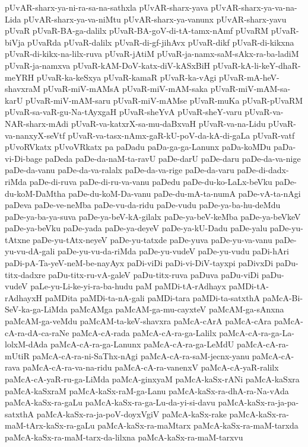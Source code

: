 {pUvAR-sharx-ya-ni-ra-sa-na-sathxla
pUvAR-sharx-yava
pUvAR-sharx-ya-va-na-Lida
pUvAR-sharx-ya-va-niMtu
pUvAR-sharx-ya-vanunx
pUvAR-sharx-yavu
pUvaR
pUvaR-BA-ga-dalilx
pUvaR-BA-goV-di-tA-tamx-nAmf
pUvaRM
pUvaR-biVja
pUvaRda
pUvaR-dalilx
pUvaR-di-gf-jihAvx
pUvaR-dikf
pUvaR-di-kikxna
pUvaR-di-kikx-na-lilx-ruva
pUvaR-jAtiM
pUvaR-ja-namx-saM-sAkx-ra-ba-ladiM
pUvaR-ja-namxva
pUvaR-kAM-DoV-katx-diV-kASxBiH
pUvaR-kA-li-keY-dhaR-meYRH
pUvaR-ka-keSxya
pUvaR-kamaR
pUvaR-ka-vAgi
pUvaR-mA-heV-shavxraM
pUvaR-miV-mAMsA
pUvaR-miV-mAM-saka
pUvaR-miV-mAM-sa-karU
pUvaR-miV-mAM-saru
pUvaR-miV-mAMse
pUvaR-muKa
pUvaR-pUvaRM
pUvaR-sa-vaR-gu-Na-tAyxgaH
pUvaR-sheYvA
pUvaR-sheY-varu
pUvaR-va-NAR-sharx-mAdi
pUvaR-va-katxrX-sa-mu-daBxvaH
pUvaR-va-na-Lidu
pUvaR-va-nanxyX-seVtf
pUvaR-va-tasx-nAmx-gaR-kU-poV-da-kA-di-gaLa
pUvaR-vatf
pUvoRVkatx
pUvoVRkatx
pa
paDadu
paDa-ga-ga-Lanunx
paDa-koMDu
paDa-vi-Di-bage
paDeda
paDe-da-naM-ta-ravU
paDe-darU
paDe-daru
paDe-da-va-nige
paDe-da-vanu
paDe-da-va-ralalx
paDe-da-va-rige
paDe-da-varu
paDe-di-dadx-riMda
paDe-di-ruva
paDe-di-ru-va-vanu
paDedu
paDe-du-ko-LaLx-beVku
paDe-du-koM-DaMtha
paDe-du-koM-Da-vanu
paDe-du-mA-ta-numA
paDe-vA-ta-nAgi
paDeva
paDe-ve-neMba
paDe-vu-da-ridu
paDe-vudu
paDe-ya-ba-hu-deMdu
paDe-ya-ba-ya-suva
paDe-ya-beV-kA-gilalx
paDe-ya-beV-keMba
paDe-ya-beVkeV
paDe-ya-beVku
paDe-yada
paDe-ya-deyeV
paDe-ya-kU-Dadu
paDe-yalu
paDe-yu-tAtxne
paDe-yu-tAtx-neyeV
paDe-yu-tatxde
paDe-yuva
paDe-yu-va-vanu
paDe-yu-vu-dA-gali
paDe-yu-vu-da-riMda
paDe-yu-vudeV
paDe-yu-vudu
paDi-hAri
paDi-pA-Ta-yeV-neM-be-nayAyx
paDi-viDi
paDi-vi-DiV-tayxpi
paDivxDi
paDu-titx-dadxre
paDu-titx-ru-vA-galeV
paDu-titx-ruva
paDuva
paDu-viDi
paDu-vudeV
paLe-yu-Li-ke-yi-ra-ba-hudu
paM
paMDi-tA-rAdhayx
paMDi-tA-rAdhayxH
paMDita
paMDi-ta-nA-gali
paMDi-tara
paMDi-ta-satxthA
paMcA-Bi-SeV-ka-ga-LiMda
paMcAMga
paMcAM-ga-mu-cayxteV
paMcAM-ga-sAnxna
paMcAM-ga-veMdu
paMcAM-ta-keV-shavxra
paMcA-cArA
paMcA-cAra
paMcA-cA-ra-dA-ca-raNe
paMcA-cA-rada
paMcA-cA-ra-ga-Lalilx
paMcA-cA-ra-ga-La-lolxM-dAda
paMcA-cA-ra-ga-Lanunx
paMcA-cA-ra-ga-LeMdU
paMcA-cA-ra-mUtiR
paMcA-cA-ra-ni-SaThx-nAgi
paMcA-cA-ra-saM-jecnx-yanu
paMcA-cA-rava
paMcA-cA-ra-va-na-ridu
paMcA-cA-ra-vanenxV
paMcA-cA-yaR-ralilx
paMcA-cA-yaR-ru-ga-LiMda
paMcA-ginxyaM
paMcA-kaSx-rANi
paMcA-kaSxra
paMcA-kaSxraM
paMcA-kaSx-raM-ga-Lanu
paMcA-kaSx-ra-dhA-ra-Na-vAda
paMcA-kaSx-ra-gaLu
paMcA-kaSx-ra-ga-Lu-da-yi-si-davu
paMcA-kaSx-ra-ja-pa-satxthA
paMcA-kaSx-ra-ja-poV-doyxVgiV
paMcA-kaSx-rake
paMcA-kaSx-ra-maM-tArx-kaSx-ra-gaLu
paMcA-kaSx-ra-maMtarx
paMcA-kaSx-ra-maM-tarxda
paMcA-kaSx-ra-maM-tarx-da-lilxna
paMcA-kaSx-ra-maM-tarxvu
}
